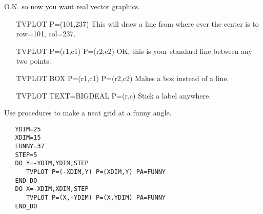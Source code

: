 O.K. so now you want real vector graphics.
\begin{itemize}
  \item[TVPLOT P=(101,237)\hfill]{This will draw a line from where ever
       the center is to row=101, col=237.}
  \item[TVPLOT P=(r1,c1) P=(r2,c2)\hfill]{OK, this is your standard line
       between any two points.}
  \item[TVPLOT BOX P=(r1,c1) P=(r2,c2)\hfill]{Makes a box instead of a line.}
  \item[TVPLOT TEXT=BIGDEAL P=(r,c)\hfill]{Stick a label anywhere.}
\end{itemize}
Use procedures to make a neat grid at a funny angle.
\begin{verbatim}
   YDIM=25 
   XDIM=15 
   FUNNY=37 
   STEP=5
   DO Y=-YDIM,YDIM,STEP
      TVPLOT P=(-XDIM,Y) P=(XDIM,Y) PA=FUNNY
   END_DO
   DO X=-XDIM,XDIM,STEP
      TVPLOT P=(X,-YDIM) P=(X,YDIM) PA=FUNNY
   END_DO
\end{verbatim}

